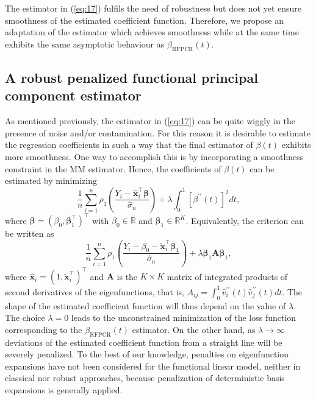 \documentclass[11pt]{article}
\begin{document}
The estimator in (\ref{eq:17}) fulfils the need of robustness but does not yet ensure smoothness of the estimated coefficient function. Therefore, we propose an adaptation of the estimator which achieves smoothness while at the same time exhibits the same asymptotic behaviour as $\beta_{{\scriptscriptstyle \text{RFPCR}}}(t)$.

\subsection{A robust penalized functional principal component estimator}

As mentioned previously, the estimator in (\ref{eq:17}) can be quite wiggly in the presence of noise and/or contamination. For this reason it is desirable to estimate the regression coefficients in such a way that the final estimator of $\beta(t)$ exhibits more smoothness. One way to accomplish this is by incorporating a smoothness constraint in the MM estimator. Hence, the coefficients of $\beta(t)$ can be estimated by minimizing
\begin{equation}
\label{eq:19}
\frac{1}{n} \sum_{i=1}^n \rho_1 \left( \frac{Y_i - \mathbf{\widehat{x}}_i^{\top} \boldsymbol{\beta} }{\widehat{\sigma}_n} \right) + \lambda \int_{0}^{1} \left[ \beta^{\prime \prime} (t) \right]^2 dt,
\end{equation}
where $\boldsymbol{\beta} = \left(\beta_0, \boldsymbol{\beta}_1^{\top} \right)^{\top}$ with $\beta_0 \in \mathbb{R}$ and $\boldsymbol{\beta}_1 \in \mathbb{R}^{K}$. Equivalently, the criterion can be written as
\begin{equation*}
\frac{1}{n} \sum_{i=1}^n \rho_1 \left( \frac{Y_i - \beta_0 - \mathbf{\widetilde{x}}_i^{\top} \boldsymbol{\beta}_1 }{\widehat{\sigma}_n} \right) + \lambda \boldsymbol{\beta}_1  \mathbf{A} \boldsymbol{\beta}_1,
\end{equation*}
where $\mathbf{\widehat{x}}_i = (1, \mathbf{\widetilde{x}}_i^{\top})^{\top}$ and $\mathbf{A}$ is the $K\times K$ matrix of integrated products of second derivatives of the eigenfunctions, that is, $A_{ij} = \int_{0}^{1} \widehat{v}_i^{\prime \prime} (t) \widehat{v}_j^{\prime \prime} (t) dt$. The shape of the estimated coefficient function will thus depend on the value of $\lambda$. The choice $\lambda = 0$ leads to the unconstrained minimization of the loss function corresponding to the $\beta_{{\scriptscriptstyle \text{RFPCR}}}(t)$ estimator. On the other hand, as $\lambda \to \infty$ deviations of the estimated coefficient function from a straight line will be severely penalized. To the best of our knowledge, penalties on eigenfunction expansions have not been considered for the functional linear model, neither in classical nor robust approaches, because penalization of deterministic basis expansions is generally applied. 
\end{document}
